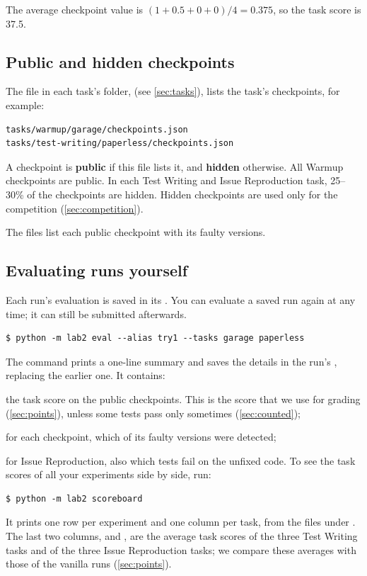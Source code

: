\documentclass[letterpaper,11pt]{article}
\begin{document}
The average checkpoint value is $(1 + 0.5 + 0 + 0) / 4 = 0.375$, so the task
score is 37.5.

\subsection{Public and hidden checkpoints}
\label{sec:public}

The file  in each task's folder,  (see \mbox{\autoref{sec:tasks}}), lists the task's checkpoints, for example:

\begin{verbatim}
tasks/warmup/garage/checkpoints.json
tasks/test-writing/paperless/checkpoints.json
\end{verbatim}

A checkpoint is \textbf{public} if this file lists it, and \textbf{hidden}
otherwise. All Warmup checkpoints are public. In each Test Writing and Issue
Reproduction task, 25--30\% of the checkpoints are hidden. Hidden checkpoints
are used only for the competition (\autoref{sec:competition}).

The files list each public checkpoint with its faulty versions.

\subsection{Evaluating runs yourself}
\label{sec:evalyourself}

Each run's evaluation is saved in its . You can evaluate a saved run again at any time; it can still be submitted afterwards.

\begin{verbatim}
$ python -m lab2 eval --alias try1 --tasks garage paperless
\end{verbatim}

The command prints a one-line summary and saves the details in the run's
, replacing the earlier one. It contains:
\squishlist
 \item the task score on the public checkpoints. This is the score that we use
   for grading (\autoref{sec:points}), unless some tests pass only sometimes
   (\autoref{sec:counted});
 \item for each checkpoint, which of its faulty versions were detected;
 \item for Issue Reproduction, also which tests fail on the unfixed code.
\squishend
To see the task scores of all your experiments side by side, run:
\begin{verbatim}
$ python -m lab2 scoreboard
\end{verbatim}
It prints one row per experiment and one column per task, from the
 files under . The last two columns,  and
, are the average task scores of the three Test Writing tasks and
of the three Issue Reproduction tasks; we compare these averages with those of
the vanilla runs (\autoref{sec:points}).
\end{document}
